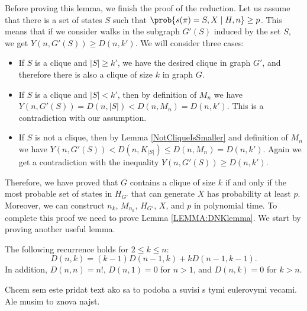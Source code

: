 Before proving this lemma, we finish the proof of the reduction. Let
us assume that there is a set of states $S$ such that
$\prob{s(\pi)=S,X \mid H,n}\ge p$. This means that if we consider walks in the
subgraph $G'(S)$ induced by the set $S$, we get $Y(n,G'(S))\ge
D(n,k')$. We will consider three cases:
\begin{itemize}[itemsep=-1mm]
\item If $S$ is a clique and $|S|\ge k'$, we have the desired clique in 
graph $G'$, and therefore there is also a clique of size $k$ in graph $G$. 
\item If $S$ is a clique and $|S|<k'$, then by definition of $M_n$ we have 
$Y(n,G'(S))=D(n,|S|)<D(n,M_n) = 
D(n,k')$. This is a contradiction with our assumption. 
\item If $S$ is not a clique, then by Lemma \ref{NotCliqueIsSmaller}
  and definition of $M_n$ we have $Y(n,G'(S)) < D(n, K_{|S|}) \le
  D(n,M_n) = D(n,k')$. Again we get a contradiction with 
the inequality $Y(n,G'(S))\ge D(n,k')$.
\end{itemize}
Therefore, we have proved that $G$ contains a clique of size $k$ if and
only if the most probable set of states in $H_{G'}$ that can generate $X$ has
probability at least $p$. Moreover, we can construct $n_k$, $M_{n_k}$,
$H_{G'}$, $X$, and $p$ in polynomial time.
To complete this proof we need to prove Lemma \ref{LEMMA:DNKlemma}.  We
start by proving another useful lemma.

\begin{lemma}\label{RecurenceLemma}
The following recurrence holds for $2\leq k\leq n$:
$$D(n,k)=(k-1) D(n-1,k) + k D(n-1,k-1).$$
In addition, $D(n,n)=n!$, $D(n,1) = 0$ for $n>1$, and $D(n,k) = 0$ for $k>n$.
\end{lemma}

\begin{reformulate*}
Chcem sem este pridat text ako sa to podoba a suvisi s tymi eulerovymi vecami.
Ale musim to znova najst.
\end{reformulate*}

